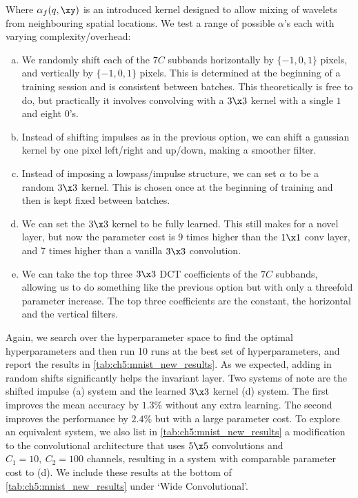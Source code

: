 Where $\alpha_f(q, \xy)$ is an introduced kernel designed to allow mixing of
wavelets from neighbouring spatial locations. We test a range of possible
$\alpha$'s each with varying complexity/overhead:

\begin{enumerate}[(a)]
  \item We randomly shift each of the $7C$ subbands horizontally
    by $\{-1, 0, 1\}$ pixels, and vertically by $\{-1, 0, 1\}$ pixels. This is
    determined at the beginning of a training session and is consistent between
    batches. This theoretically is free to do, but practically it involves
    convolving with a $3 \x 3$ kernel with a single $1$ and eight $0$'s.
  \item Instead of shifting impulses as in the previous option, we can shift a
    gaussian kernel by one pixel left/right and up/down, making a smoother filter. 
  \item Instead of imposing a lowpass/impulse structure, we can set $\alpha$ to
    be a random $3\x 3$ kernel. This is chosen once at the beginning of training and then
    is kept fixed between batches.
  \item We can set the $3\x 3$ kernel to be fully learned. This
    still makes for a novel layer, but now the parameter cost is 9 times higher
    than the $1\x 1$ conv layer, and 7 times higher than a vanilla $3\x 3$
    convolution.
  \item We can take the top three $3\x 3$ DCT coefficients of the $7C$
    subbands, allowing us to do something like the previous option 
    but with only a threefold parameter increase. The top three coefficients are
    the constant, the horizontal and the vertical filters.
\end{enumerate}

Again, we search over the hyperparameter space to find the optimal
hyperparameters and then run 10 runs at the best set of hyperparameters, and
report the results in \autoref{tab:ch5:mnist_new_results}. As we expected,
adding in random shifts significantly helps the invariant layer. Two systems of
note are the shifted impulse (a) system and the learned $3\x 3$ kernel (d)
system. The first improves the mean accuracy by $1.3\%$ without any extra
learning. The second improves the performance by $2.4\%$ but with a large
parameter cost. To explore an equivalent system, we also list in
\autoref{tab:ch5:mnist_new_results} a modification to the convolutional
architecture that uses $5\x 5$ convolutions and $C_1 = 10,\ C_2 = 100$ channels,
resulting in a system with comparable parameter cost to (d). We include these
results at the bottom of \autoref{tab:ch5:mnist_new_results} under `Wide
Convolutional'.


